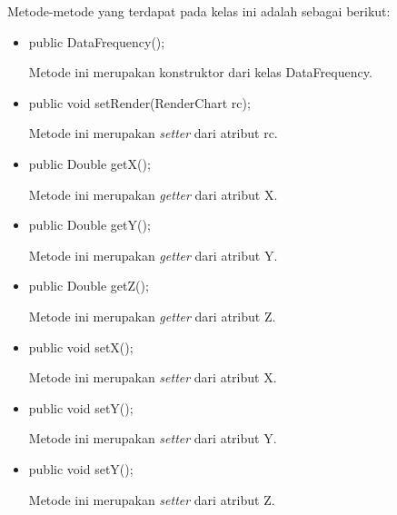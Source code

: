 Metode-metode yang terdapat pada kelas ini adalah sebagai berikut:
\begin{itemize}
    \item public DataFrequency();
    
    Metode ini merupakan konstruktor dari kelas DataFrequency.
    
    \item public void setRender(RenderChart rc);
    
    Metode ini merupakan \textit{setter} dari atribut rc.
    
    \item public Double getX();
    
    Metode ini merupakan \textit{getter} dari atribut X.
    
     \item public Double getY();
    
    Metode ini merupakan \textit{getter} dari atribut Y.
    
    \item public Double getZ();
    
    Metode ini merupakan \textit{getter} dari atribut Z.
    
    \item public void setX();
    
    Metode ini merupakan \textit{setter} dari atribut X.
    
    \item public void setY();
    
    Metode ini merupakan \textit{setter} dari atribut Y.
    
    \item public void setY();
    
    Metode ini merupakan \textit{setter} dari atribut Z.
    
\end{itemize}


